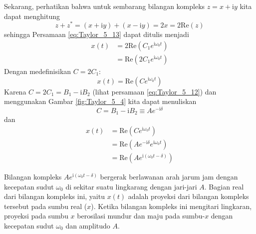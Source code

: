 Sekarang, perhatikan bahwa untuk sembarang bilangan kompleks $z = x + \mathrm{i}y$
kita dapat menghitung
\begin{equation*}
z + z^{*} = (x + \mathrm{i}y) + (x - \mathrm{i}y) = 2x = 2\mathrm{Re}(z)
\end{equation*}
sehingga Persamaan \eqref{eq:Taylor_5_13} dapat ditulis menjadi
\begin{align*}
x(t) & = 2\mathrm{Re}\left(C_{1}e^{\mathrm{i}\omega_0 t} \right) \\
     & = \mathrm{Re}\left(2C_{1}e^{\mathrm{i}\omega_0 t} \right)
\end{align*}
Dengan medefinisikan $C = 2C_{1}$:
\begin{equation*}
x(t) = \mathrm{Re}\left(C e^{\mathrm{\mathrm{i}}\omega_0 t}\right)
\end{equation*}
Karena $C = 2C_1 = B_1 - \mathrm{i}B_2$ (lihat persamaan \eqref{eq:Taylor_5_12})
dan menggunakan Gambar \ref{fig:Taylor_5_4} kita dapat menuliskan
\begin{equation}
C = B_1 - \mathrm{i}B_2 \equiv A e^{-\mathrm{i}\delta}
\end{equation}
dan
\begin{align*}
x(t) & = \mathrm{Re}\left(Ce^{\mathrm{\mathrm{i}}\omega_{0} t}\right) \\
 & = \mathrm{Re}\left(Ae^{\mathrm{-i}\delta}e^{\mathrm{i}\omega_{0} t} \right) \\
 & = \mathrm{Re}\left(Ae^{\mathrm{i}(\omega_{0} t-\delta)}\right)
\end{align*}

Bilangan kompleks $Ae^{\mathrm{i}(\omega_0 t - \delta)}$ bergerak berlawanan arah jarum jam dengan
kecepatan sudut $\omega_0$ di sekitar suatu lingkarang dengan jari-jari $A$. Bagian real dari
bilangan kompleks ini, yaitu $x(t)$ adalah proyeksi dari bilangan kompleks tersebut pada
sumbu real ($x$). Ketika bilangan kompleks ini mengitari lingkaran, proyeksi pada sumbu $x$
berosilasi mundur dan maju pada sumbu-$x$ dengan kecepatan sudut $\omega_0$ dan amplitudo $A$.